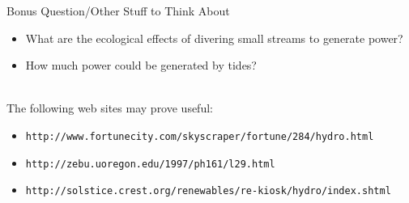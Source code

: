 Bonus Question/Other Stuff to Think About
\begin{itemize}
\item What are the ecological effects of divering small streams to
generate power?

\item How much power could be generated by tides?

\end{itemize}


\hspace{2mm}\\
The following web sites may prove useful:
\begin{itemize}

\item {\tt http://www.fortunecity.com/skyscraper/fortune/284/hydro.html}

\item {\tt http://zebu.uoregon.edu/1997/ph161/l29.html}

\item {\tt http://solstice.crest.org/renewables/re-kiosk/hydro/index.shtml}

\end{itemize}






